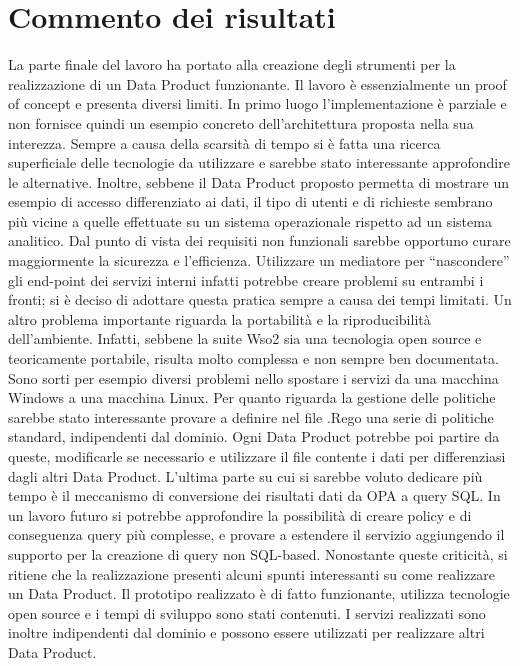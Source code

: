\documentclass[a4paper,12pt]{report}
\begin{document}
\section{Commento dei risultati}\label{commento risultati}
La parte finale del lavoro ha portato alla creazione degli strumenti per la realizzazione di un Data Product funzionante.
Il lavoro è essenzialmente un proof of concept e presenta diversi limiti.
In primo luogo l'implementazione è parziale e non fornisce quindi un esempio concreto dell'architettura proposta nella sua interezza.
Sempre a causa della scarsità di tempo si è fatta una ricerca superficiale delle tecnologie da utilizzare e sarebbe stato interessante approfondire le alternative.
Inoltre, sebbene il Data Product proposto permetta di mostrare un esempio di accesso differenziato ai dati, il tipo di utenti e di richieste sembrano più vicine a quelle effettuate su un sistema operazionale rispetto ad un sistema analitico.
Dal punto di vista dei requisiti non funzionali sarebbe opportuno curare maggiormente la sicurezza e l'efficienza. 
Utilizzare un mediatore per ``nascondere'' gli end-point dei servizi interni infatti potrebbe creare problemi su entrambi i fronti; si è deciso di adottare questa pratica sempre a causa dei tempi limitati.
Un altro problema importante riguarda la portabilità e la riproducibilità dell'ambiente. 
Infatti, sebbene la suite Wso2 sia una tecnologia open source e teoricamente portabile, risulta molto complessa e non sempre ben documentata. 
Sono sorti per esempio diversi problemi nello spostare i servizi da una macchina Windows a una macchina Linux.
Per quanto riguarda la gestione delle politiche sarebbe stato interessante provare a definire nel file .Rego una serie di politiche standard, indipendenti dal dominio.
Ogni Data Product potrebbe poi partire da queste, modificarle se necessario e utilizzare il file contente i dati per differenziasi dagli altri Data Product.
L'ultima parte su cui si sarebbe voluto dedicare più tempo è il meccanismo di conversione dei risultati dati da OPA a query SQL.
In un lavoro futuro si potrebbe approfondire la possibilità di creare policy e di conseguenza query più complesse, e provare a estendere il servizio aggiungendo il supporto per la creazione di query non SQL-based.
Nonostante queste criticità, si ritiene che la realizzazione presenti alcuni spunti interessanti su come realizzare un Data Product.
Il prototipo realizzato è di fatto funzionante, utilizza tecnologie open source e i tempi di sviluppo sono stati contenuti.
I servizi realizzati sono inoltre indipendenti dal dominio e possono essere utilizzati per realizzare altri Data Product.
\end{document}
